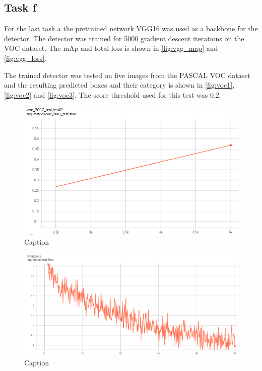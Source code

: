 \documentclass{article}
\begin{document}
\subsection{Task f}
For the last task a the pretrained network VGG16 was used as a backbone for the detector. The detector was trained for 5000 gradient descent iterations on the VOC dataset. The mAp and total loss is shown in \autoref{fig:vgg_map} and \autoref{fig:vgg_loss}.


The trained detector was tested on five images from the PASCAL VOC dataset and the resulting predicted boxes and their category is shown in \autoref{fig:voc1}, \autoref{fig:voc2} and \autoref{fig:voc3}. The score threshold used for this test was $0.2$.


\begin{figure}[H]
    \centering
    \includegraphics[width=\textwidth]{Assignments/Assignment_4/plots/vgg/map_vgg.png}
    \caption{Caption}
    \label{fig:vgg_map}
\end{figure}



\begin{figure}[H]
    \centering
    \includegraphics[width=\textwidth]{Assignments/Assignment_4/plots/vgg/tot_loss_vgg.png}
    \caption{Caption}
    \label{fig:vgg_loss}
\end{figure}
\end{document}
